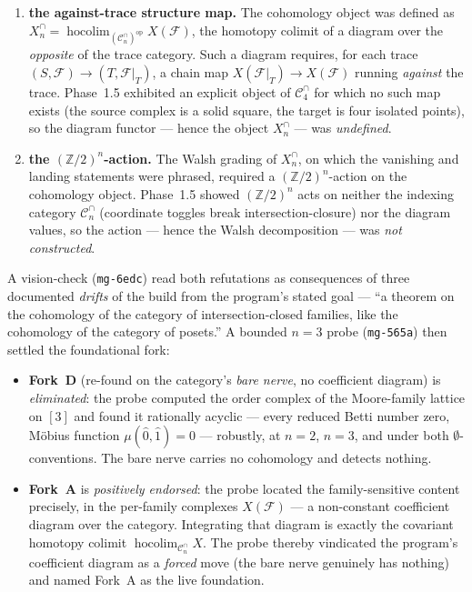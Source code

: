 \documentclass[11pt,oneside]{amsart}
\theoremstyle{plain}
\theoremstyle{definition}
\theoremstyle{remark}
\theoremstyle{honeststyle}
\newcommand{\F}{\mathcal{F}}
\newcommand{\Z}{\mathbb{Z}}
\newcommand{\Cn}{\mathcal{C}^{\cap}_n}
\newcommand{\hocolim}{\operatorname*{hocolim}}
\begin{document}
\begin{enumerate}[label=\textup{(\alph*)},leftmargin=2.4em]
\item \textbf{the against-trace structure map.} The cohomology object
  was defined as $X^{\cap}_n=\hocolim_{(\Cn)^{\mathrm{op}}}X(\F)$, the
  homotopy colimit of a diagram over the \emph{opposite} of the trace
  category. Such a diagram requires, for each trace
  $(S,\F)\to(T,\F|_T)$, a chain map $X(\F|_T)\to X(\F)$ running
  \emph{against} the trace. Phase~1.5 exhibited an explicit object of
  $\mathcal C^{\cap}_4$ for which no such map exists (the source
  complex is a solid square, the target is four isolated points), so
  the diagram functor --- hence the object $X^{\cap}_n$ --- was
  \emph{undefined}.
\item \textbf{the $(\Z/2)^n$-action.} The Walsh grading of
  $X^{\cap}_n$, on which the vanishing and landing statements were
  phrased, required a $(\Z/2)^n$-action on the cohomology object.
  Phase~1.5 showed $(\Z/2)^n$ acts on neither the indexing category
  $\Cn$ (coordinate toggles break intersection-closure) nor the
  diagram values, so the action --- hence the Walsh decomposition ---
  was \emph{not constructed}.
\end{enumerate}

A vision-check (\texttt{mg-6edc}) read both refutations as consequences
of three documented \emph{drifts} of the build from the program's
stated goal --- ``a theorem on the cohomology of the category of
intersection-closed families, like the cohomology of the category of
posets.'' A bounded $n=3$ probe (\texttt{mg-565a}) then settled the
foundational fork:

\begin{itemize}[leftmargin=1.5em]
\item \textbf{Fork~D} (re-found on the category's \emph{bare nerve}, no
  coefficient diagram) is \emph{eliminated}: the probe computed the
  order complex of the Moore-family lattice on $[3]$ and found it
  rationally acyclic --- every reduced Betti number zero, M\"obius
  function $\mu(\hat0,\hat1)=0$ --- robustly, at $n=2$, $n=3$, and
  under both $\emptyset$-conventions. The bare nerve carries no
  cohomology and detects nothing.
\item \textbf{Fork~A} is \emph{positively endorsed}: the probe located
  the family-sensitive content precisely, in the per-family complexes
  $X(\F)$ --- a non-constant coefficient diagram over the category.
  Integrating that diagram is exactly the covariant homotopy colimit
  $\hocolim_{\Cn}X$. The probe thereby vindicated the program's
  coefficient diagram as a \emph{forced} move (the bare nerve genuinely
  has nothing) and named Fork~A as the live foundation.
\end{itemize}
\end{document}
